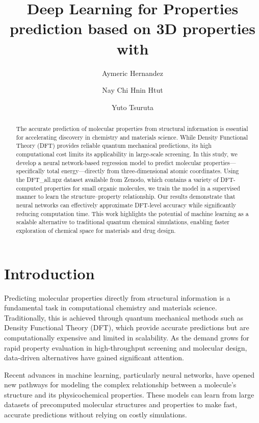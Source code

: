 \documentclass{article}
\title{Deep Learning for Properties prediction based on 3D properties with }
\author{Aymeric Hernandez\\
  \and
  Nay Chi Hnin Htut\\
  \and
  Yuto Tsuruta
}
\begin{document}
\maketitle

\begin{abstract}
The accurate prediction of molecular properties from structural information is essential for accelerating discovery in chemistry and materials science. While Density Functional Theory (DFT) provides reliable quantum mechanical predictions, its high computational cost limits its applicability in large-scale screening. In this study, we develop a neural network-based regression model to predict molecular properties—specifically total energy—directly from three-dimensional atomic coordinates. Using the DFT\_all.npz dataset available from Zenodo, which contains a variety of DFT-computed properties for small organic molecules, we train the model in a supervised manner to learn the structure–property relationship. Our results demonstrate that neural networks can effectively approximate DFT-level accuracy while significantly reducing computation time. This work highlights the potential of machine learning as a scalable alternative to traditional quantum chemical simulations, enabling faster exploration of chemical space for materials and drug design.
\end{abstract}

\section{Introduction}

Predicting molecular properties directly from structural information is a fundamental task in computational chemistry and materials science. Traditionally, this is achieved through quantum mechanical methods such as Density Functional Theory (DFT), which provide accurate predictions but are computationally expensive and limited in scalability. As the demand grows for rapid property evaluation in high-throughput screening and molecular design, data-driven alternatives have gained significant attention.



Recent advances in machine learning, particularly neural networks, have opened new pathways for modeling the complex relationship between a molecule’s structure and its physicochemical properties. These models can learn from large datasets of precomputed molecular structures and properties to make fast, accurate predictions without relying on costly simulations.
\end{document}
